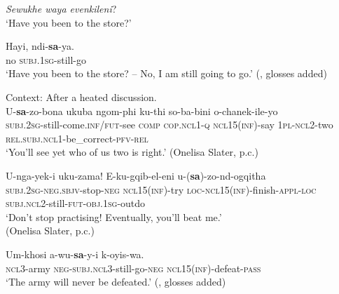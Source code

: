 \begin{exe}
	\ex\label{exXhosaAntiterminative1}
	\begin{xlist}
		 \textit{Sewukhe waya evenkileni}?\\
		\lq Have you been to the store?\rq{}
		
		\gll  Hayi, ndi-\textbf{sa}-ya.\\
		 no \textsc{subj}.1\textsc{sg}-still-go\\
		\glt \lq Have you been to the store? -- No, I am still going to go.\rq{ }(\cite[149]{GreaterDictionaryXhosa}, glosses added)
	\end{xlist}
	
	
	\ex\label{exXhosaAntiterminative2}
	Context: After a heated discussion.\\
	\gll U-\textbf{sa}-zo-bona ukuba ngom-phi ku-thi so-ba-bini o-chanek-ile-yo\\
	\textsc{subj}.2\textsc{sg}-still-come.\textsc{inf}/\textsc{fut}-see \textsc{comp} \textsc{cop}.\textsc{ncl}1-\textsc{q} \textsc{ncl}15(\textsc{inf})-say  1\textsc{pl}-\textsc{ncl}2-two \textsc{rel}.\textsc{subj}.\textsc{ncl}1-be\_correct-\textsc{pfv}-\textsc{rel}\\
	\glt \lq You'll see yet who of us two is right.' (Onelisa Slater, p.c.)
	
	\ex\label{exXhosaAntiterminative3}
	\gll U-nga-yek-i uku-zama! E-ku-gqib-el-eni u-(\textbf{sa})-zo-nd-ogqitha\\
	\textsc{subj}.2\textsc{sg}-\textsc{neg}.\textsc{sbjv}-stop-\textsc{neg} \textsc{ncl}15(\textsc{inf})-try \textsc{loc}-\textsc{ncl}15(\textsc{inf})-finish-\textsc{appl}-\textsc{loc} \textsc{subj}.\textsc{ncl}2-still-\textsc{fut}-\textsc{obj}.1\textsc{sg}-outdo\\
	\glt \lq Don't stop practising! Eventually, you'll beat me.'
	\\(Onelisa Slater, p.c.)
	
	\ex\label{exXhosaAntiterminative4}
	\gll Um-khosi a-wu-\textbf{sa}-y-i k-oyis-wa.\\
	\textsc{ncl}3-army \textsc{neg}-\textsc{subj}.\textsc{ncl}3-still-go-\textsc{neg} \textsc{ncl}15(\textsc{inf})-defeat-\textsc{pass}\\
	\glt \lq The army will never be defeated.\rq{ }(\cite[132]{McLaren1936}, glosses added)
\end{exe}

